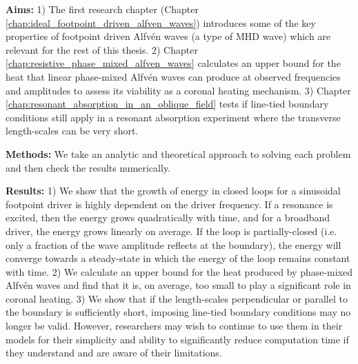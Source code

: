 \begin{spacing}{1.1}
\textbf{Aims:}
1) The first research chapter (Chapter \ref{chap:ideal_footpoint_driven_alfven_waves}) introduces some of the key properties of footpoint driven Alfv\'en waves (a type of MHD wave) which are relevant for the rest of this thesis.
2) Chapter \ref{chap:resistive_phase_mixed_alfven_waves} calculates an upper bound for the heat that linear phase-mixed Alfv\'en waves can produce at observed frequencies and amplitudes to assess its viability as a coronal heating mechanism.
3) Chapter \ref{chap:resonant_absorption_in_an_oblique_field} tests if line-tied boundary conditions still apply in a resonant absorption experiment where the transverse length-scales can be very short.

\textbf{Methods:} 
We take an analytic and theoretical approach to solving each problem and then check the results numerically.

\textbf{Results:} 
1) We show that the growth of energy in closed loops for a sinusoidal footpoint driver is highly dependent on the driver frequency. If a resonance is excited, then the energy grows quadratically with time, and for a broadband driver, the energy grows linearly on average. If the loop is partially-closed (i.e. only a fraction of the wave amplitude reflects at the boundary), the energy will converge towards a steady-state in which the energy of the loop remains constant with time. 
2) We calculate an upper bound for the heat produced by phase-mixed Alfv\'en waves and find that it is, on average, too small to play a significant role in coronal heating. 
3) We show that if the length-scales perpendicular or parallel to the boundary is sufficiently short, imposing line-tied boundary conditions may no longer be valid. However, researchers may wish to continue to use them in their models for their simplicity and ability to significantly reduce computation time if they understand and are aware of their limitations.

\end{spacing}
